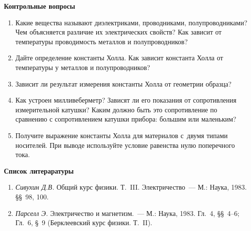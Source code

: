 {\small

{\bf \Large Контрольные вопросы}
\begin{enumerate}



\item{ Какие вещества называют диэлектриками, проводниками, полупроводниками? Чем объясняется различие их электрических свойств? Как зависит от температуры проводимость металлов и полупроводников?}

\item{ Дайте определение константы Холла. Как зависит константа Холла от температуры у металлов и полупроводников?}

\item{ Зависит ли результат измерения константы Холла от геометрии образца?}

\item{ Как устроен милливеберметр? Зависят ли его показания от сопротивления измерительной катушки? Каким должно быть это сопротивление по сравнению с сопротивлением катушки прибора: большим или маленьким?}

\item{ Получите выражение константы Холла для материалов с~двумя типами носителей. При выводе используйте условие равенства нулю поперечного тока.}

\end{enumerate}

{\bf \Large Список литераратуры}

\begin{enumerate}


\item{ \emph{Сивухин Д.В.} Общий курс физики. Т.~III. Электричество~--- М.: Наука, 1983. \S\S~98, 100.}

\item{ \emph{Парселл Э.} Электричество и магнетизм.~--- М.: Наука, 1983. Гл.~4, \S\S~4--6; Гл.~6, \S~9 (Берклеевский курс физики. Т.~II).
    }

\end{enumerate}
}



